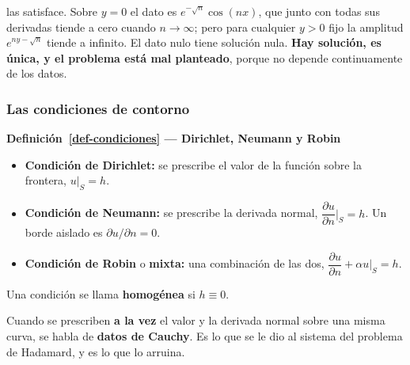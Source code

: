 \documentclass[
  spanish,
  a4paper,
]{scrbook}
\providecommand{\tightlist}{%
  \setlength{\itemsep}{0pt}\setlength{\parskip}{0pt}}
\theoremstyle{definition}
\theoremstyle{plain}
\theoremstyle{definition}
\theoremstyle{plain}
\theoremstyle{definition}
\theoremstyle{remark}
\begin{document}
las satisface. Sobre \(y=0\) el dato es \(e^{-\sqrt n}\cos(nx)\), que
junto con todas sus derivadas tiende a cero cuando \(n\to\infty\); pero
para cualquier \(y>0\) fijo la amplitud \(e^{ny-\sqrt n}\) tiende a
infinito. El dato nulo tiene solución nula. \textbf{Hay solución, es
única, y el problema está mal planteado}, porque no depende
continuamente de los datos.

\subsubsection{Las condiciones de
contorno}\label{las-condiciones-de-contorno}

\begin{tcolorbox}[enhanced jigsaw, arc=.35mm, bottomrule=.15mm, breakable, colback=white, colframe=quarto-callout-note-color-frame, left=2mm, leftrule=.75mm, opacityback=0, rightrule=.15mm, toprule=.15mm]
\begin{minipage}[t]{5.5mm}
\textcolor{quarto-callout-note-color}{\faInfo}
\end{minipage}%
\begin{minipage}[t]{\textwidth - 5.5mm}

\vspace{-3mm}\textbf{Definición~\ref{def-condiciones} --- Dirichlet, Neumann y Robin}\vspace{3mm}

\begin{itemize}
\tightlist
\item
  \textbf{Condición de Dirichlet:} se prescribe el valor de la función
  sobre la frontera, \(u\big|_S = h\).
\item
  \textbf{Condición de Neumann:} se prescribe la derivada normal,
  \(\dfrac{\partial u}{\partial n}\Big|_S = h\). Un borde aislado es
  \(\partial u/\partial n = 0\).
\item
  \textbf{Condición de Robin} o \textbf{mixta:} una combinación de las
  dos, \(\dfrac{\partial u}{\partial n} + \alpha u\Big|_S = h\).
\end{itemize}

Una condición se llama \textbf{homogénea} si \(h \equiv 0\).

\end{minipage}%
\end{tcolorbox}

Cuando se prescriben \textbf{a la vez} el valor y la derivada normal
sobre una misma curva, se habla de \textbf{datos de Cauchy}. Es lo que
se le dio al sistema del problema de Hadamard, y es lo que lo arruina.
\end{document}
